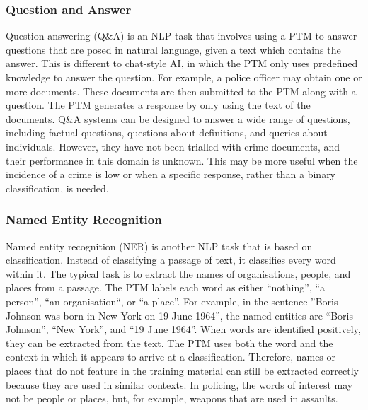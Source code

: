 \subsubsection{Question and Answer} Question answering (Q\&A) is an NLP task that involves using a PTM to answer questions that are posed in natural language, given a text which contains the answer. This is different to chat-style AI, in which the PTM only uses predefined knowledge to answer the question. For example, a police officer may obtain one or more documents. These documents are then submitted to the PTM along with a question. The PTM generates a response by only using the text of the documents. Q\&A systems can be designed to answer a wide range of questions, including factual questions, questions about definitions, and queries about individuals. However, they have not been trialled with crime documents, and their performance in this domain is unknown. This may be more useful when the incidence of a crime is low or when a specific response, rather than a binary classification, is needed.

\subsubsection{Named Entity Recognition} Named entity recognition (NER) is another NLP task that is based on classification. Instead of classifying a passage of text, it classifies every word within it. The typical task is to extract the names of organisations, people, and places from a passage. The PTM labels each word as either “nothing”, “a person”, “an organisation“, or “a place”. For example, in the sentence ”Boris Johnson was born in New York on 19 June 1964”, the named entities are “Boris Johnson”, “New York”, and “19 June 1964”. When words are identified positively, they can be extracted from the text. The PTM uses both the word and the context in which it appears to arrive at a classification. Therefore, names or places that do not feature in the training material can still be extracted correctly because they are used in similar contexts. In policing, the words of interest may not be people or places, but, for example, weapons that are used in assaults. 


